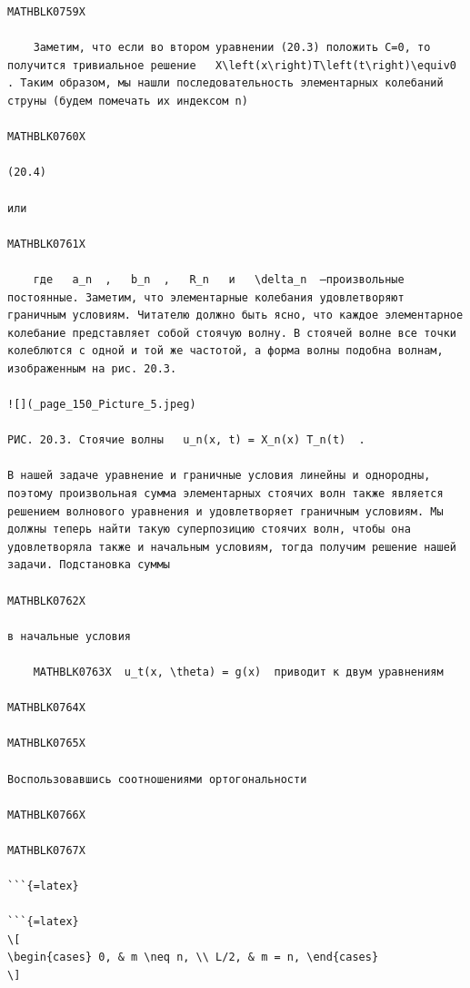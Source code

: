 \documentclass[
]{article}
\begin{document}
\begin{verbatim}
MATHBLK0759X

    Заметим, что если во втором уравнении (20.3) положить C=0, то получится тривиальное решение   X\left(x\right)T\left(t\right)\equiv0  . Таким образом, мы нашли последовательность элементарных колебаний струны (будем помечать их индексом n)

MATHBLK0760X

(20.4)

или

MATHBLK0761X

    где   a_n  ,   b_n  ,   R_n   и   \delta_n  —произвольные постоянные. Заметим, что элементарные колебания удовлетворяют граничным условиям. Читателю должно быть ясно, что каждое элементарное колебание представляет собой стоячую волну. В стоячей волне все точки колеблются с одной и той же частотой, а форма волны подобна волнам, изображенным на рис. 20.3.

![](_page_150_Picture_5.jpeg)

РИС. 20.3. Стоячие волны   u_n(x, t) = X_n(x) T_n(t)  .

В нашей задаче уравнение и граничные условия линейны и однородны, поэтому произвольная сумма элементарных стоячих волн также является решением волнового уравнения и удовлетворяет граничным условиям. Мы должны теперь найти такую суперпозицию стоячих волн, чтобы она удовлетворяла также и начальным условиям, тогда получим решение нашей задачи. Подстановка суммы

MATHBLK0762X

в начальные условия

    MATHBLK0763X  u_t(x, \theta) = g(x)  приводит к двум уравнениям

MATHBLK0764X

MATHBLK0765X

Воспользовавшись соотношениями ортогональности

MATHBLK0766X

MATHBLK0767X

```{=latex}

```{=latex}
\[
\begin{cases} 0, & m \neq n, \\ L/2, & m = n, \end{cases}
\]
\end{verbatim}
\end{document}
